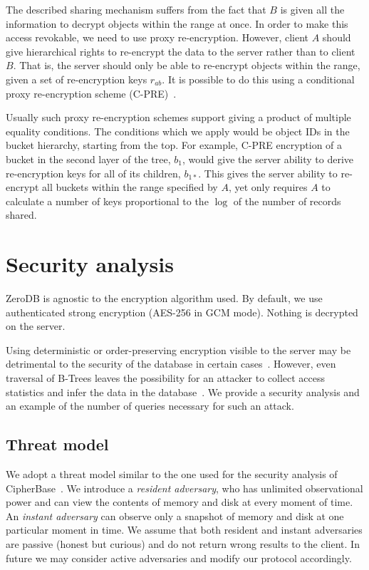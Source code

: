 \documentclass[notitlepage,longbibliography]{revtex4-1}
\begin{document}
The described sharing mechanism suffers from the fact that $B$ is given all the information to decrypt objects within the range at once.
In order to make this access revokable, we need to use proxy re-encryption.
However, client $A$ should give hierarchical rights to re-encrypt the data to the server rather than to client $B$.
That is, the server should only be able to re-encrypt objects within the range, given a set of re-encryption keys $r_{ab}$.
It is possible to do this using a conditional proxy re-encryption scheme (C-PRE)~\cite{conditional-pre-2009,unidirectional-pre-2010,conditional-pre-2014,hierarchical-pre}.

Usually such proxy re-encryption schemes support giving a product of multiple equality conditions.
The conditions which we apply would be object IDs in the bucket hierarchy, starting from the top.
For example, C-PRE encryption of a bucket in the second layer of the tree, $b_1$, would give the server ability to derive re-encryption keys for all of its children, $b_{1*}$.
This gives the server ability to re-encrypt all buckets within the range specified by $A$, yet only requires $A$ to calculate a number of keys proportional to the $\log$ of the number of records shared.

\section{Security analysis}

ZeroDB is agnostic to the encryption algorithm used.
By default, we use authenticated strong encryption ({AES-256} in GCM mode).
Nothing is decrypted on the server.

Using deterministic or order-preserving encryption visible to the server may be detrimental to the security of the database in certain cases~\cite{cryptdb-hacked}.
However, even traversal of B-Trees leaves the possibility for an attacker to collect access statistics and infer the data in the database~\cite{access-pattern-attack}.
We provide a security analysis and an example of the number of queries necessary for such an attack.

\subsection{Threat model}

We adopt a threat model similar to the one used for the security analysis of CipherBase~\cite{cipherbase}.
We introduce a \emph{resident adversary}, who has unlimited observational power and can view the contents of memory and disk at every moment of time.
An \emph{instant adversary} can observe only a snapshot of memory and disk at one particular moment in time.
We assume that both resident and instant adversaries are passive (honest but curious) and do not return wrong results to the client.
In future we may consider active adversaries and modify our protocol accordingly.
\end{document}
